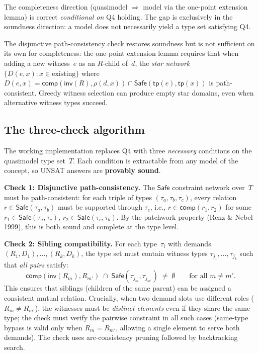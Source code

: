\documentclass[a4paper,11pt]{article}
\theoremstyle{definition}
\newcommand{\inv}{\ensuremath{\mathsf{inv}}}
\newcommand{\comp}{\ensuremath{\mathsf{comp}}}
\newcommand{\tp}{\ensuremath{\mathsf{tp}}}
\newcommand{\Safe}{\ensuremath{\mathsf{Safe}}}
\begin{document}
The completeness direction (quasimodel $\Rightarrow$ model via
the one-point extension lemma) is correct \emph{conditional on}
Q4 holding.  The gap is exclusively in the soundness direction:
a model does not necessarily yield a type set satisfying Q4.

The disjunctive path-consistency check restores soundness
but is not sufficient on its own for completeness: the
one-point extension lemma requires that when adding a new
witness~$e$ as an $R$-child of~$d$, the \emph{star network}
$\{D(e,x) : x \in \text{existing}\}$ where
$D(e,x) = \comp(\inv(R), \rho(d,x)) \cap \Safe(\tp(e), \tp(x))$
is path-consistent.  Greedy witness selection can produce
empty star domains, even when alternative witness types succeed.

\subsection{The three-check algorithm}

The working implementation replaces Q4 with three \emph{necessary}
conditions on the quasimodel type set~$T$.  Each condition is
extractable from any model of the concept, so UNSAT answers are
\textbf{provably sound}.

\medskip\noindent\textbf{Check 1: Disjunctive path-consistency.}\;
The $\Safe$ constraint network over~$T$ must be
path-consistent: for each triple of types
$(\tau_a, \tau_b, \tau_c)$, every relation
$r \in \Safe(\tau_a, \tau_b)$ must be supported through
$\tau_c$, i.e., $r \in \comp(r_1, r_2)$ for some
$r_1 \in \Safe(\tau_a, \tau_c)$, $r_2 \in \Safe(\tau_c, \tau_b)$.
By the patchwork property (Renz \& Nebel 1999), this is both
sound and complete at the type level.

\medskip\noindent\textbf{Check 2: Sibling compatibility.}\;
For each type~$\tau_i$ with demands $(R_1, D_1), \ldots, (R_k, D_k)$,
the type set must contain witness types
$\tau_{j_1}, \ldots, \tau_{j_k}$ such that
\emph{all pairs} satisfy:
\[
  \comp(\inv(R_m), R_{m'}) \;\cap\; \Safe(\tau_{j_m}, \tau_{j_{m'}}) \;\neq\; \emptyset
  \qquad \text{for all } m \neq m'.
\]
This ensures that siblings (children of the same parent)
can be assigned a consistent mutual relation.  Crucially,
when two demand slots use different roles ($R_m \neq R_{m'}$),
the witnesses must be \emph{distinct elements} even if they
share the same type; the check must verify the pairwise
constraint in all such cases (same-type bypass is valid only
when $R_m = R_{m'}$, allowing a single element to serve both
demands).  The check uses arc-consistency pruning followed
by backtracking search.
\end{document}
